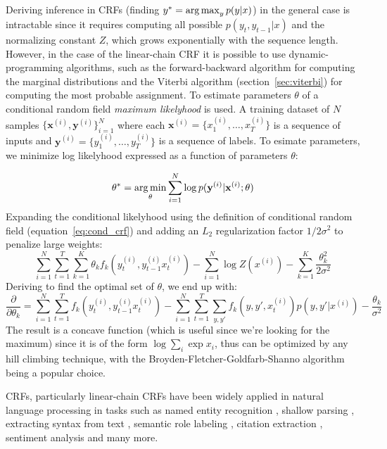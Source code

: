 Deriving inference in CRFs (finding 
$y^* = \operatorname*{arg\,max}_y p(y | x)$) 
in the general case is intractable since 
it requires computing all possible $p(y_t, y_{t - 1} | x)$ 
and the normalizing constant $Z$, which grows exponentially with the 
sequence length. 
However, in the case of the linear-chain CRF it is possible to 
use dynamic-programming algorithms, such as the
forward-backward algorithm \citep{devijver1985baum} 
for computing the marginal distributions and 
the Viterbi algorithm
(section~\ref{sec:viterbi}) for computing
the most probable assignment. 
To estimate parameters $\theta$ of a conditional 
random field \textit{maximum likelyhood} is used.
A training dataset of $N$ samples $\{\mathbf{x}^{(i)}, \mathbf{y}^{(i)}\}^{N}_{i=1}$
where each $\mathbf{x}^{(i)} = \{x_{1}^{(i)}, \dots, x_{T}^{(i)}\}$
is a sequence of inputs
and $\mathbf{y}^{(i)} = \{y_{1}^{(i)}, \dots, y_{T}^{(i)}\}$ is 
a sequence of labels. To esimate parameters, we
minimize log likelyhood expressed as a function of parameters $\theta$:

$$
\theta^{*} = \operatorname*{arg\,min}_{\theta} \sum_{i=1}^{N} \log p(\mathbf{y}^{(i)} | \mathbf{x}^{(i)} ; \theta)
$$
Expanding the conditional likelyhood using the definition of conditional random field
(equation~\ref{eq:cond_crf}) and adding an $L_2$ regularization factor $1/2 \sigma^2$ 
to penalize large weights:
$$
\sum_{i=1}^{N} \sum_{t=1}^{T} \sum_{k=1}^{K} \theta_k f_k (y_{t}^{(i)}, y_{t - 1}^{(i)} x_{t}^{(i)}) 
- \sum_{i=1}^N \log Z(x^{(i)}) - \sum_{k=1}^{K} \frac{\theta_{k}^{2}}{2 \sigma^2}
$$
Deriving to find the optimal set of $\theta$, we end up with:
$$
\frac{\partial }{\partial \theta_k} = \sum_{i=1}^{N} \sum_{t=1}^{T} f_k (y_{t}^{(i)}, y_{t - 1}^{(i)} x_{t}^{(i)}) 
- \sum_{i=1}^{N} \sum_{t=1}^{T} \sum_{y, y'} f_k (y, y', x_{t}^{(i)}) p(y, y'|x^{(i)}) - \frac{\theta_k}{\sigma^2}
$$
The result is a concave function (which is useful since we're looking for the 
maximum) since it is of the form $\log \sum_i \exp x_i$, thus can be optimized by
any hill climbing technique, with the 
Broyden-Fletcher-Goldfarb-Shanno algorithm \citep{liu1989limited} being a popular 
choice. 

CRFs, particularly linear-chain CRFs
have been widely applied in natural language processing in tasks such as
named entity recognition \citep{liu2011recognizing}, shallow parsing \citep{sha2003shallow}, 
extracting syntax from text \citep{taskar2004max}, 
semantic role labeling \citep{cohn2005semantic}, citation extraction \citep{wellner2004integrated}, 
sentiment analysis \citep{patra2014ju_cse} and many more. 

